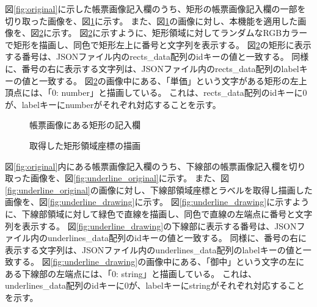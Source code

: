 図\ref{fig:original}に示した帳票画像記入欄のうち、矩形の帳票画像記入欄の一部を切り取った画像を、図\ref{fig:rect_original}に示す。
また、図\ref{fig:rect_original}の画像に対し、本機能を適用した画像を、図\ref{fig:rect_drawing}に示す。
図\ref{fig:rect_drawing}に示すように、矩形領域に対してランダムなRGBカラーで矩形を描画し、同色で矩形左上に番号と文字列を表示する。
図\ref{fig:rect_drawing}の矩形に表示する番号は、JSONファイル内のrects\_data配列のidキーの値と一致する。
同様に、番号の右に表示する文字列は、JSONファイル内のrects\_data配列のlabelキーの値と一致する。
図\ref{fig:rect_drawing}の画像中にある、「単価」という文字がある矩形の左上頂点には、「0: number」と描画している。
これは、rects\_data配列のidキーに0が、labelキーにnumberがそれぞれ対応することを示す。

\begin{figure}[t]
    \begin{center}
        \caption{帳票画像にある矩形の記入欄}
        \label{fig:rect_original}
    \end{center}
\end{figure}

\begin{figure}[t]
    \begin{center}
        \caption{取得した矩形領域座標の描画}
        \label{fig:rect_drawing}
    \end{center}
\end{figure}

図\ref{fig:original}内にある帳票画像記入欄のうち、下線部の帳票画像記入欄を切り取った画像を、図\ref{fig:underline_original}に示す。
また、図\ref{fig:underline_original}の画像に対し、下線部領域座標とラベルを取得し描画した画像を、図\ref{fig:underline_drawing}に示す。
図\ref{fig:underline_drawing}に示すように、下線部領域に対して緑色で直線を描画し、同色で直線の左端点に番号と文字列を表示する。
図\ref{fig:underline_drawing}の下線部に表示する番号は、JSONファイル内のunderlines\_data配列のidキーの値と一致する。
同様に、番号の右に表示する文字列は、JSONファイル内のunderlines\_data配列のlabelキーの値と一致する。
図\ref{fig:underline_drawing}の画像中にある、「御中」という文字の左にある下線部の左端点には、「0: string」と描画している。
これは、underlines\_data配列のidキーに0が、labelキーにstringがそれぞれ対応することを示す。


